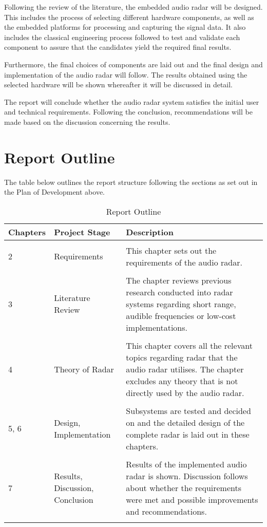 Following the review of the literature, the embedded audio radar will be designed. This includes the process of selecting different hardware components, as well as the embedded platforms for processing and capturing the signal data. It also includes the classical engineering process followed to test and validate each component to assure that the candidates yield the required final results. 

Furthermore, the final choices of components are laid out and the final design and implementation of the audio radar will follow. The results obtained using the selected hardware will be shown whereafter it will be discussed in detail.

The report will conclude whether the audio radar system satisfies the initial user and technical requirements. Following the conclusion, recommendations will be made based on the discussion concerning the results.

\newpage
\section{Report Outline}
The table below outlines the report structure following the sections as set out in the Plan of Development above.
\begin{table}[h!]
  \begin{center}
    \label{tab:outline}
    \begin{tabular}{p{}p{}p{}}
    \hline
      \textbf{Chapters} & \textbf{Project Stage} & \textbf{Description}\\
      \hline
      \\ 2 & Requirements & This chapter sets out the requirements of the audio radar. \\ \\
      3 & Literature Review & The chapter reviews previous research conducted into radar systems regarding short range, audible frequencies or low-cost implementations.\\ \\
      4 & Theory of Radar & This chapter covers all the relevant topics regarding radar that the audio radar utilises. The chapter excludes any theory that is not directly used by the audio radar.\\ \\
      5, 6 & Design, Implementation & Subsystems are tested and decided on and the detailed design of the complete radar is laid out in these chapters.\\ \\
      7 & Results, Discussion, Conclusion & Results of the implemented audio radar is shown. Discussion follows about whether the requirements were met and possible improvements and recommendations.\\ \\ 
      \hline
    \end{tabular}
  \end{center}
  \caption{Report Outline}
\end{table}


\newpage